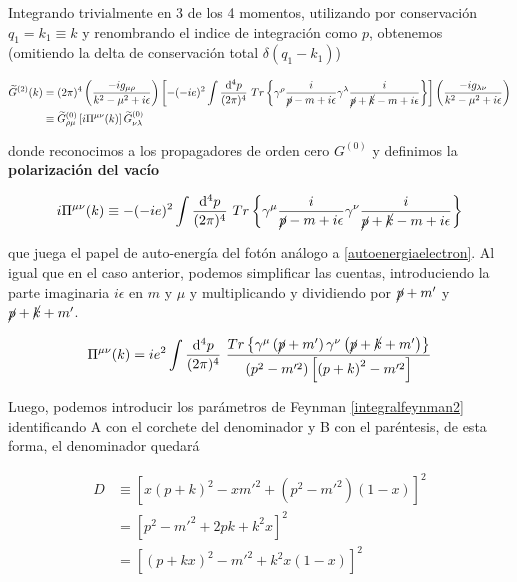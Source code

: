 \documentclass[tickz]{article}
\numberwithin{equation}{section}
\begin{document}
Integrando trivialmente en 3 de los 4 momentos, utilizando por conservación $ q_1=k_1 \equiv k $ y renombrando el indice de integración como $ p $, obtenemos (omitiendo la delta de conservación total $ \delta(q_1-k_1) $)

\begin{equation}\label{key}
\begin{aligned}
\widetilde{G}^{(2)}(k)&=(2\pi)^{4} \left(\frac{-ig_{\mu \rho}}{k^2 - \mu^2 +i\epsilon}\right) \left[-(-ie)^{2} \int \frac{\mathrm{d^4}p}{(2\pi)^4} \ Tr\left\{ \gamma^{\rho} \frac{i}{\cancel{p} -m+i\epsilon} \gamma^{\lambda} \frac{i}{\cancel{p} + \cancel{k} -m +i\epsilon}   \right\} \right]  \left(\frac{-ig_{\lambda \nu}}{k^2 - \mu^2 +i\epsilon}\right)\\
&\equiv \widetilde{G}^{(0)}_{\rho\mu} \left[ i \Pi^{\mu\nu}(k)\right] \widetilde{G}^{(0)}_{\nu\lambda} 
\end{aligned}
\end{equation}

donde reconocimos a los propagadores de orden cero $ G^{(0)} $ y definimos la \textbf{polarización del vacío}

\begin{equation}\label{vacumpolarization}
i \Pi^{\mu\nu}(k) \equiv -(-ie)^{2} \int \frac{\mathrm{d^4}p}{(2\pi)^4} \ Tr\left\{ \gamma^{\mu} \frac{i}{\cancel{p} -m+i\epsilon} \gamma^{\nu} \frac{i}{\cancel{p} + \cancel{k} -m +i\epsilon}   \right\}
\end{equation}

que juega el papel de auto-energía del fotón análogo a \ref{autoenergiaelectron}. Al igual que en el caso anterior, podemos simplificar las cuentas, introduciendo la parte imaginaria $ i\epsilon $ en $ m $ y $ \mu $ y multiplicando y dividiendo por $ \cancel{p}+m' $ y $ \cancel{p}+\cancel{k}+m' $.

\begin{equation}\label{aux5}
\Pi^{\mu\nu}(k) = i e^2 \int \frac{\mathrm{d^4}p}{(2\pi)^4} \ \frac{Tr\left\{ \gamma^{\mu}\left(\cancel{p}+m'\right)\gamma^{\nu}\left(\cancel{p}+\cancel{k}+m'\right) \right\}}{\left(p^2 -m'^2\right)\left[\left(p+k\right)^2 -m'^2 \right]}   
\end{equation}

Luego, podemos introducir los parámetros de Feynman \ref{integralfeynman2} identificando A con el corchete del denominador y B con el paréntesis, de esta forma, el denominador quedará

\begin{equation}\label{key}
\begin{aligned}
D&\equiv \left[x\left(p+k\right)^2-xm'^2 + \left(p^2 - m'^2\right)(1-x)\right]^2\\
&=\left[p^2-m'^2 + 2pk + k^2x\right]^2\\
&=\left[\left(p+kx\right)^2 - m'^2 + k^2x(1-x)\right]^2
\end{aligned}
\end{equation}
\end{document}
